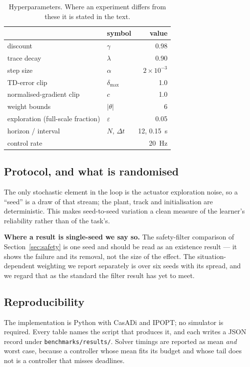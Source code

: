 \documentclass[letterpaper, 10 pt, conference]{ieeeconf}
\begin{document}
\begin{table}[t]
  \centering
  \caption{Hyperparameters. Where an experiment differs from these it is stated
  in the text.}
  \label{tab:hyper}
  \begin{tabular}{llr}
    \toprule
    & symbol & value \\
    \midrule
    discount                & $\gamma$          & 0.98 \\
    trace decay             & $\lambda$         & 0.90 \\
    step size               & $\alpha$          & $2\times10^{-3}$ \\
    TD-error clip           & $\delta_{\max}$   & 1.0 \\
    normalised-gradient clip& $c$               & 1.0 \\
    weight bounds           & $|\theta|$        & 6 \\
    exploration (full-scale fraction) & $\varepsilon$ & 0.05 \\
    horizon / interval      & $N$, $\Delta t$   & 12, \SI{0.15}{\second} \\
    control rate            &                   & \SI{20}{\hertz} \\
    \bottomrule
  \end{tabular}
\end{table}

\subsection{Protocol, and what is randomised}
The only stochastic element in the loop is the actuator exploration noise, so a
``seed'' is a draw of that stream; the plant, track and initialisation are
deterministic. This makes seed-to-seed variation a clean measure of the
learner's reliability rather than of the task's.

\textbf{Where a result is single-seed we say so.} The safety-filter comparison
of Section~\ref{sec:safety} is one seed and should be read as an existence
result --- it shows the failure and its removal, not the size of the effect.
The situation-dependent weighting we report separately is over six seeds with
its spread, and we regard that as the standard the filter result has yet to
meet.

\subsection{Reproducibility}
The implementation is Python with CasADi and IPOPT; no simulator is required.
Every table names the script that produces it, and each writes a JSON record
under \texttt{benchmarks/results/}. Solver timings are reported as mean
\emph{and} worst case, because a controller whose mean fits its budget and whose
tail does not is a controller that misses deadlines.
\end{document}
